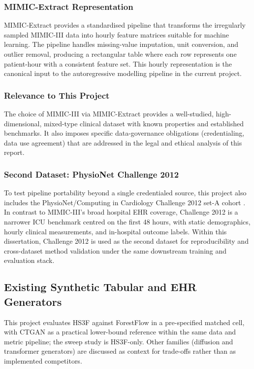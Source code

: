 \subsubsection{MIMIC-Extract Representation}
MIMIC-Extract \cite{wang2020mimicextract} provides a standardised pipeline that transforms the irregularly sampled MIMIC-III data into hourly feature matrices suitable for machine learning. The pipeline handles missing-value imputation, unit conversion, and outlier removal, producing a rectangular table where each row represents one patient-hour with a consistent feature set. This hourly representation is the canonical input to the autoregressive modelling pipeline in the current project.

\subsubsection{Relevance to This Project}
The choice of MIMIC-III via MIMIC-Extract provides a well-studied, high-dimensional, mixed-type clinical dataset with known properties and established benchmarks. It also imposes specific data-governance obligations (credentialing, data use agreement) that are addressed in the legal and ethical analysis of this report.

\subsubsection{Second Dataset: PhysioNet Challenge 2012}
To test pipeline portability beyond a single credentialed source, this project also includes the PhysioNet/Computing in Cardiology Challenge 2012 set-A cohort \cite{silva2012challenge}. In contrast to MIMIC-III's broad hospital EHR coverage, Challenge 2012 is a narrower ICU benchmark centred on the first 48 hours, with static demographics, hourly clinical measurements, and in-hospital outcome labels. Within this dissertation, Challenge 2012 is used as the second dataset for reproducibility and cross-dataset method validation under the same downstream training and evaluation stack.

\subsection{Existing Synthetic Tabular and EHR Generators}
This project evaluates HS3F against ForestFlow in a pre-specified matched cell, with CTGAN as a practical lower-bound reference within the same data and metric pipeline; the sweep study is HS3F-only. Other families (diffusion and transformer generators) are discussed as context for trade-offs rather than as implemented competitors.

